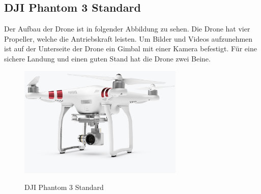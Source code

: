 \subsection{DJI Phantom 3 Standard}\label{subsec: Phantom 3}
Der Aufbau der Drone ist in folgender Abbildung zu sehen. Die Drone hat vier Propeller, welche die Antriebskraft leisten. Um Bilder und Videos aufzunehmen ist auf der Unterseite der Drone ein Gimbal mit einer Kamera befestigt. Für eine sichere Landung und einen guten Stand hat die Drone zwei Beine.
\newline
\begin{figure}[H]
	\begin{center}
		{\includegraphics[width=0.7\textwidth]{images/DJI_Phantom_3_Standard.jpg}}
		\caption{DJI Phantom 3 Standard \cite{DJI.Phantom3}}
	\end{center}
\end{figure}

